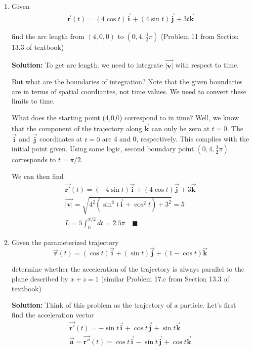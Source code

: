 \documentclass[letterpaper, 11pt]{article}
\begin{document}
\begin{enumerate}
\item Given
\begin{align*}
\vec{\bm{r}}(t)= (4\cos t)\vec{\bm{i}}+(4\sin t)\vec{\bm{j}}+3t\vec{\bm{k}}
\label{eq:traj1}
\end{align*}

find the arc length from $(4,0,0)$ to $(0,4,\frac{3}{2}\pi)$ (Problem 11 from Section 13.3 of textbook)

\par \textbf{Solution:} To get arc length, we need to integrate $\vec{\bm{|v|}}$ with respect to time. 

But what are the boundaries of integration? Note that the given boundaries are in terms of spatial coordiantes, not time values. We need to convert these limits to time. 

What does the starting point (4,0,0) correspond to in time? Well, we know that the component of the trajectory along $\vec{\bm{k}}$ can only be zero at $t=0$. The $\vec{\bm{i}}$ and $\vec{\bm{j}}$ coordinates at $t=0$ are 4 and 0, respectively. This complies with the initial point given. Using same logic, second boundary point $(0,4,\frac{3}{2}\pi)$ corresponds to $t=\pi/2$.

We can then find
\begin{gather*}
\vec{\bm{r'}}(t)= (-4\sin t)\vec{\bm{i}} + (4\cos t)\vec{\bm{j}} + 3\vec{\bm{k}}\\
\vec{\bm{|v|}}= \sqrt{4^2(\sin ^2 t\vec{\bm{i}}+\cos ^2 t)+3^2}=5\\
L =  5 \int_{0}^{\pi/2}dt=2.5\pi\quad\blacksquare
\end{gather*}
\item Given the parameterized trajectory 
\[ \vec{\bm{r}}(t)= (\cos t)\vec{\bm{i}}+(\sin t)\vec{\bm{j}}+(1-\cos t)\vec{\bm{k}}\]

determine whether the acceleration of the trajectory is always parallel to the plane described by $x+z=1$ (similar Problem 17.c from Section 13.3 of textbook) 

\par \textbf{Solution:} Think of this problem as the trajectory of a particle. Let's first find the acceleration vector
\begin{gather*}
\vec{\bm{r'}}(t)= -\sin t\vec{\bm{i}}+\cos t\vec{\bm{j}}+\sin t\vec{\bm{k}} \\
\vec{\bm{a}}=\vec{\bm{r''}}(t)= \cos t\vec{\bm{i}}-\sin t\vec{\bm{j}}+\cos t\vec{\bm{k}}
\end{gather*}


\end{enumerate}
\end{document}
